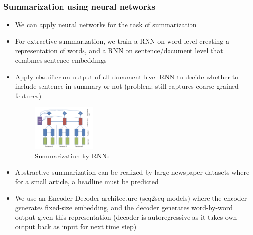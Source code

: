\subsubsection{Summarization using neural networks}
\begin{itemize}
	\item We can apply neural networks for the task of summarization
	\item For extractive summarization, we train a RNN on word level creating a representation of words, and a RNN on sentence/document level that combines sentence embeddings
	\item Apply classifier on output of all document-level RNN to decide whether to include sentence in summary or not (problem: still captures coarse-grained features)
	\begin{figure}[ht]
		\centering
		\includegraphics[width=0.3\textwidth]{figures/summarization_rnn.png}
		\caption{Summarization by RNNs}
		\label{fig:summarization_rnn}
	\end{figure}
	\item Abstractive summarization can be realized by large newspaper datasets where for a small article, a headline must be predicted
	\item We use an Encoder-Decoder architecture (seq2seq models) where the encoder generates fixed-size embedding, and the decoder generates word-by-word output given this representation (decoder is autoregressive as it takes own output back as input for next time step)
\end{itemize}
